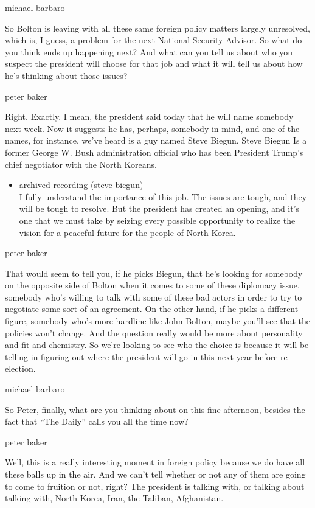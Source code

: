 michael barbaro

So Bolton is leaving with all these same foreign policy matters largely
unresolved, which is, I guess, a problem for the next National Security
Advisor. So what do you think ends up happening next? And what can you
tell us about who you suspect the president will choose for that job and
what it will tell us about how he's thinking about those issues?

peter baker

Right. Exactly. I mean, the president said today that he will name
somebody next week. Now it suggests he has, perhaps, somebody in mind,
and one of the names, for instance, we've heard is a guy named Steve
Biegun. Steve Biegun Is a former George W. Bush administration official
who has been President Trump's chief negotiator with the North Koreans.

\begin{itemize}
\tightlist
\item
  archived recording (steve biegun)\\
  I fully understand the importance of this job. The issues are tough,
  and they will be tough to resolve. But the president has created an
  opening, and it's one that we must take by seizing every possible
  opportunity to realize the vision for a peaceful future for the people
  of North Korea.
\end{itemize}

peter baker

That would seem to tell you, if he picks Biegun, that he's looking for
somebody on the opposite side of Bolton when it comes to some of these
diplomacy issue, somebody who's willing to talk with some of these bad
actors in order to try to negotiate some sort of an agreement. On the
other hand, if he picks a different figure, somebody who's more hardline
like John Bolton, maybe you'll see that the policies won't change. And
the question really would be more about personality and fit and
chemistry. So we're looking to see who the choice is because it will be
telling in figuring out where the president will go in this next year
before re-election.

michael barbaro

So Peter, finally, what are you thinking about on this fine afternoon,
besides the fact that ``The Daily'' calls you all the time now?

peter baker

Well, this is a really interesting moment in foreign policy because we
do have all these balls up in the air. And we can't tell whether or not
any of them are going to come to fruition or not, right? The president
is talking with, or talking about talking with, North Korea, Iran, the
Taliban, Afghanistan.

